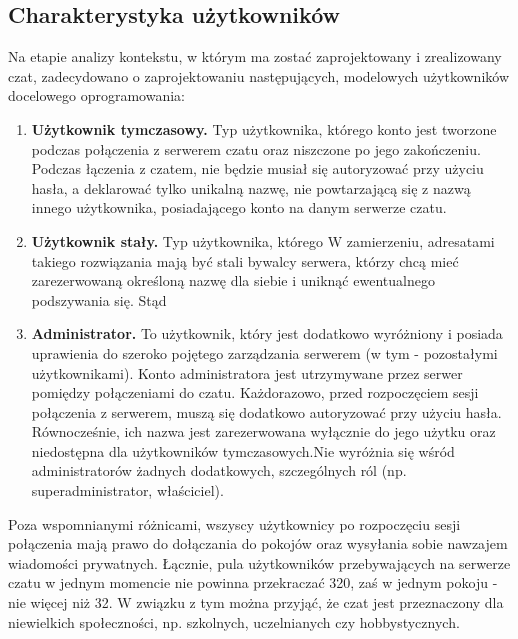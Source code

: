 \subsection{Charakterystyka użytkowników}

Na etapie analizy kontekstu, w którym ma zostać zaprojektowany i zrealizowany czat, zadecydowano o zaprojektowaniu następujących,
modelowych użytkowników docelowego oprogramowania:

\begin{enumerate}

	\item \textbf{Użytkownik tymczasowy.} Typ użytkownika, którego konto jest tworzone podczas połączenia z serwerem czatu oraz
		niszczone po jego zakończeniu. Podczas łączenia z czatem, nie będzie musiał się autoryzować przy użyciu hasła, a deklarować
		tylko unikalną nazwę, nie powtarzającą się z nazwą innego użytkownika, posiadającego konto na danym serwerze czatu.

	\item \textbf{Użytkownik stały.} Typ użytkownika, którego W
		zamierzeniu, adresatami takiego rozwiązania mają być stali bywalcy serwera, którzy chcą mieć zarezerwowaną określoną nazwę
		dla siebie i uniknąć ewentualnego podszywania się. Stąd

	\item \textbf{Administrator.} To użytkownik, który jest dodatkowo wyróżniony i posiada uprawienia do szeroko pojętego
		zarządzania serwerem (w tym - pozostałymi użytkownikami). Konto administratora jest utrzymywane przez serwer pomiędzy połączeniami do czatu. Każdorazowo, przed rozpoczęciem sesji połączenia z serwerem, muszą się dodatkowo autoryzować przy użyciu hasła. Równocześnie, ich nazwa jest zarezerwowana wyłącznie do jego użytku oraz niedostępna
		dla użytkowników tymczasowych.Nie wyróżnia się wśród administratorów żadnych dodatkowych, szczególnych
		ról (np. superadministrator, właściciel).

\end{enumerate}

Poza wspomnianymi różnicami, wszyscy użytkownicy po rozpoczęciu sesji połączenia mają prawo do dołączania do pokojów oraz wysyłania sobie
nawzajem wiadomości prywatnych. Łącznie, pula użytkowników przebywających na serwerze czatu w jednym momencie nie powinna przekraczać 320,
zaś w jednym pokoju - nie więcej niż 32. W związku z tym można przyjąć, że czat jest przeznaczony dla niewielkich społeczności, np.
szkolnych, uczelnianych czy hobbystycznych.

